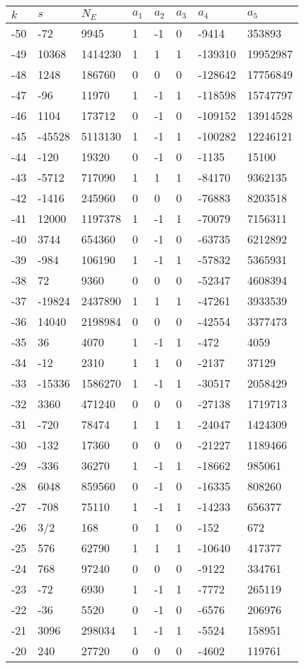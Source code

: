 \documentclass{amsart}
\begin{document}
\begin{longtable}{|l|l|l|lllll|}
\hline
$k$ & $s$ & $N_E$ & $a_1$ & $a_2$ & $a_3$ & $a_4$ & $a_5$\\
\hline
-50&-72&9945&1&-1&0&-9414&353893\\
-49&10368&1414230&1&1&1&-139310&19952987\\
-48&1248&186760&0&0&0&-128642&17756849\\
-47&-96&11970&1&-1&1&-118598&15747797\\
-46&1104&173712&0&-1&0&-109152&13914528\\
-45&-45528&5113130&1&-1&1&-100282&12246121\\
-44&-120&19320&0&-1&0&-1135&15100\\
-43&-5712&717090&1&1&1&-84170&9362135\\
-42&-1416&245960&0&0&0&-76883&8203518\\
-41&12000&1197378&1&-1&1&-70079&7156311\\
-40&3744&654360&0&-1&0&-63735&6212892\\
-39&-984&106190&1&-1&1&-57832&5365931\\
-38&72&9360&0&0&0&-52347&4608394\\
-37&-19824&2437890&1&1&1&-47261&3933539\\
-36&14040&2198984&0&0&0&-42554&3377473\\
-35&36&4070&1&-1&1&-472&4059\\
-34&-12&2310&1&1&0&-2137&37129\\
-33&-15336&1586270&1&-1&1&-30517&2058429\\
-32&3360&471240&0&0&0&-27138&1719713\\
-31&-720&78474&1&1&1&-24047&1424309\\
-30&-132&17360&0&0&0&-21227&1189466\\
-29&-336&36270&1&-1&1&-18662&985061\\
-28&6048&859560&0&-1&0&-16335&808260\\
-27&-708&75110&1&-1&1&-14233&656377\\
-26&3/2&168&0&1&0&-152&672\\
-25&576&62790&1&1&1&-10640&417377\\
-24&768&97240&0&0&0&-9122&334761\\
-23&-72&6930&1&-1&1&-7772&265119\\
-22&-36&5520&0&-1&0&-6576&206976\\
-21&3096&298034&1&-1&1&-5524&158951\\
-20&240&27720&0&0&0&-4602&119761\\

\end{longtable}
\end{document}
